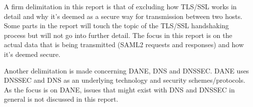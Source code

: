 A firm delimitation in this report is that of excluding how TLS/SSL works in detail and why it's deemed as a secure way for transmission between two hosts.
Some parts in the report will touch the topic of the TLS/SSL handshaking process but will not go into further detail.
The focus in this report is on the actual data that is being transmitted (SAML2 requests and responses) and how it's deemed secure. 

Another delimitation is made concerning DANE, DNS and DNSSEC.
DANE uses DNSSEC and DNS as an underlying technology and security schemes/protocols.
As the focus is on DANE, issues that might exist with DNS and DNSSEC in general is not discussed in this report.







